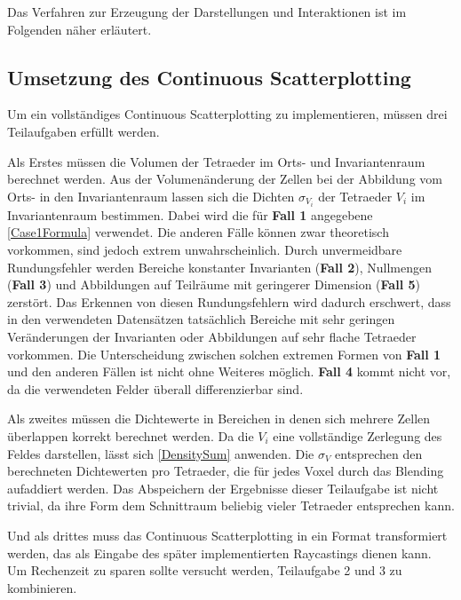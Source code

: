 \documentclass[a4paper,fontsize=12pt,toc=bib,parskip=half,ngerman]{scrartcl}
\begin{document}
Das Verfahren zur Erzeugung der Darstellungen und Interaktionen ist im Folgenden n\"aher erl\"autert.

\subsection{Umsetzung des Continuous Scatterplotting}
\label{CSPImplementation}
Um ein vollst\"andiges Continuous Scatterplotting zu implementieren, m\"ussen drei Teilaufgaben erf\"ullt werden.

Als Erstes m\"ussen die Volumen der Tetraeder im Orts- und Invariantenraum berechnet werden. Aus der Volumen\"anderung der Zellen bei der Abbildung vom Orts- in den Invariantenraum  lassen sich die Dichten $\sigma_{V_i}$ der Tetraeder $V_i$ im Invariantenraum bestimmen. Dabei wird die f\"ur \textbf{Fall 1} angegebene \cref{Case1Formula} verwendet. Die anderen F\"alle k\"onnen zwar theoretisch vorkommen, sind jedoch extrem unwahrscheinlich. Durch unvermeidbare Rundungsfehler werden Bereiche konstanter Invarianten (\textbf{Fall 2}), Nullmengen (\textbf{Fall 3}) und Abbildungen auf Teilr\"aume mit geringerer Dimension (\textbf{Fall 5}) zerst\"ort. Das Erkennen von diesen Rundungsfehlern wird dadurch erschwert, dass in den verwendeten Datens\"atzen tats\"achlich Bereiche mit sehr geringen Ver\"anderungen der Invarianten oder Abbildungen auf sehr flache Tetraeder vorkommen. Die Unterscheidung zwischen solchen extremen Formen von \textbf{Fall 1} und den anderen F\"allen ist nicht ohne Weiteres m\"oglich. \textbf{Fall 4} kommt nicht vor, da die verwendeten Felder \"uberall differenzierbar sind.

Als zweites m\"ussen die Dichtewerte in Bereichen in denen sich mehrere Zellen \"uberlappen korrekt berechnet werden. Da die $V_i$ eine vollst\"andige Zerlegung des Feldes darstellen, l\"asst sich \cref{DensitySum} anwenden. Die $\sigma_V$ entsprechen den berechneten Dichtewerten pro Tetraeder, die f\"ur jedes Voxel durch das Blending aufaddiert werden. Das Abspeichern der Ergebnisse dieser Teilaufgabe ist nicht trivial, da ihre Form dem Schnittraum beliebig vieler Tetraeder entsprechen kann.

Und als drittes muss das Continuous Scatterplotting in ein Format transformiert werden, das als Eingabe des sp\"ater implementierten Raycastings dienen kann. Um Rechenzeit zu sparen sollte versucht werden, Teilaufgabe 2 und 3 zu kombinieren.
\end{document}
